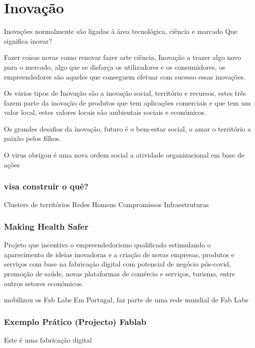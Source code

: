 \newpage
\section{Inovação}


Inovações normalmente são ligadas à área tecnológica, ciência e marcado
Que significa inovar? 

Fazer coisas novas como renovar fazer arte
ciência, Inovação a trazer algo novo para o mercado, algo que se
disfarça os utilizadores e os consumidores, os empreendedores são
aqueles que conseguem efetuar com sucesso essas inovações.

Os vários tipos de Inovação são a inovação social, território e recursos,
estes três fazem parte da inovação de produtos que tem aplicações
comerciais e que tem um valor local, estes valores locais são ambientais
sociais e económicos.

Os grandes desafios da inovação, futuro é o bem-estar social, o amar o
território a paixão pelos filhos.

O virus obrigou é uma nova ordem social a atividade organizacional em
base de ações

\subsubsection{visa construir o quê?}

Clusters de territórios Redes Homens Compromissos Infraestruturas

\subsubsection{Making Health Safer}

Projeto que incentiva o empreendedorismo qualificado estimulando o
aparecimento de ideias inovadoras e a criação de novas empresas,
produtos e serviços com base na fabricação digital com potencial de
negócio pós-covid, promoção de saúde, novas plataformas de comércio e
serviços, turismo, entre outros setores económicos.

mobilizou os Fab Labs Em Portugal, faz parte de uma rede mundial de
Fab Labs

\subsubsection{Exemplo Prático (Projecto) Fablab}

Este é uma fabricação digital

